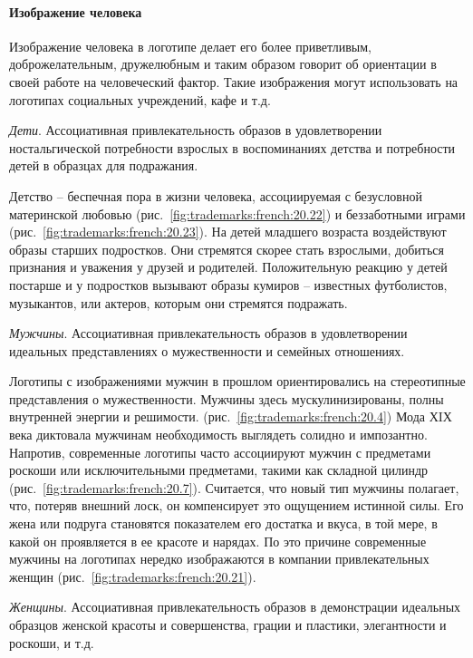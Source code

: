   \paragraph{Изображение человека} 
  
  Изображение человека в логотипе делает его более приветливым, доброжелательным, дружелюбным и таким образом говорит об ориентации в своей работе на человеческий фактор. Такие изображения могут использовать на
    логотипах социальных учреждений, кафе и т.д.
 
     \emph{Дети}. Ассоциативная привлекательность образов в удовлетворении
      ностальгической потребности взрослых в воспоминаниях детства и потребности детей
      в образцах для подражания.

      Детство -- беспечная пора в жизни человека, ассоциируемая с безусловной
      материнской любовью (рис.~\ref{fig:trademarks:french:20.22}) и беззаботными
      играми (рис.~\ref{fig:trademarks:french:20.23}). На детей младшего возраста
      воздействуют образы старших подростков. Они стремятся скорее стать взрослыми,
      добиться признания и уважения у друзей и родителей. Положительную реакцию у
      детей постарше и у подростков вызывают образы кумиров -- известных футболистов,
      музыкантов, или актеров, которым они стремятся подражать.

   \emph{Мужчины}. Ассоциативная привлекательность образов в удовлетворении
      идеальных представлениях о мужественности и семейных отношениях.

      Логотипы с изображениями мужчин в прошлом ориентировались на стереотипные
      представления о мужественности. Мужчины здесь мускулинизированы, полны
      внутренней энергии и решимости. (рис.~\ref{fig:trademarks:french:20.4})
      Мода ХIХ века диктовала мужчинам необходимость выглядеть солидно и
      импозантно. Напротив, современные логотипы часто ассоциируют мужчин с
      предметами роскоши или исключительными предметами, такими как складной
      цилиндр (рис.~\ref{fig:trademarks:french:20.7}). Считается, что новый тип
      мужчины полагает, что, потеряв внешний лоск, он компенсирует это ощущением
      истинной силы. Его жена или подруга становятся показателем его достатка и
      вкуса, в той мере, в какой он проявляется в ее красоте и нарядах. По это
      причине современные мужчины на логотипах нередко изображаются в компании
      привлекательных женщин (рис.~\ref{fig:trademarks:french:20.21}).

  \emph{Женщины}. Ассоциативная привлекательность образов в демонстрации
      идеальных образцов женской красоты и совершенства, грации и пластики,
      элегантности и роскоши, и т.д.

